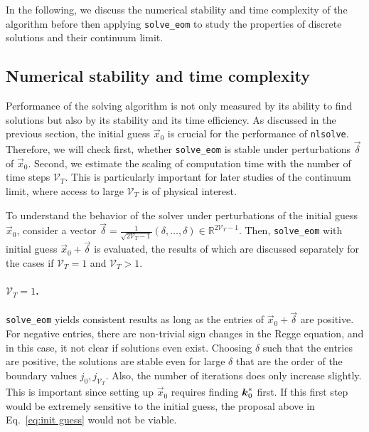 \documentclass[amsmath,amssymb,aps,twocolumn,superscriptaddress,nofootinbib]{revtex4-1}
\newcommand{\R}{\mathbb{R}}
\begin{document}
In the following, we discuss the numerical stability and time complexity of the algorithm before then applying \texttt{solve\_eom} to study the properties of discrete solutions and their continuum limit.

\subsection{Numerical stability and time complexity}

Performance of the solving algorithm is not only measured by its ability to find solutions but also by its stability and its time efficiency.
As discussed in the previous section, the initial guess $\vec{x}_0$ is crucial for the performance of \texttt{nlsolve}.
Therefore, we will check first, whether \texttt{solve\_eom} is stable under perturbations $\vec{\delta}$ of $\vec{x}_0$.
Second, we estimate the scaling of computation time with the number of time steps $\mathcal{V}_T$.
This is particularly important for later studies of the continuum limit, where access to large $\mathcal{V}_T$ is of physical interest.

To understand the behavior of the solver under perturbations of the initial guess $\vec{x}_0$, consider a vector $\vec{\delta} = \frac{1}{\sqrt{2\mathcal{V}_T - 1}}\left(\delta,\dots,\delta\right)\in\R^{2\mathcal{V}_T-1}$.
Then, \texttt{solve\_eom} with initial guess $\vec{x}_0+\vec{\delta}$ is evaluated, the results of which are discussed separately for the cases if $\mathcal{V}_T=1$ and $\mathcal{V}_T>1$.
\paragraph*{$\mathcal{V}_T=1$.} \texttt{solve\_eom} yields consistent results as long as the entries of $\vec{x}_0+\vec{\delta}$ are positive.
For negative entries, there are non-trivial sign changes in the Regge equation, and in this case, it not clear if solutions even exist.
Choosing $\delta$ such that the entries are positive, the solutions are stable even for large $\delta$ that are the order of the boundary values $j_0,j_{\mathcal{V}_T}$. 
Also, the number of iterations does only increase slightly.
This is important since setting up $\vec{x}_0$ requires finding $\vb*{k}_0^*$ first.
If this first step would be extremely sensitive to the initial guess, the proposal above in Eq.~\eqref{eq:init guess} would not be viable.
\end{document}
